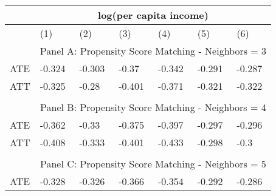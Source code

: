 \begin{table}[]
\begin{tabular}{lllllll}
\hline
                       & \multicolumn{6}{c}{log(per capita income)}                                                                                                   \\ \hline
                       & (1)                  & (2)                   & (3)                   & (4)                   & (5)                   & (6)                   \\ \hline
                       & \multicolumn{6}{c}{Panel A: Propensity Score Matching - Neighbors = 3}                                                                       \\
ATE                    & -0.324               & -0.303                & -0.37                 & -0.342                & -0.291                & -0.287                \\
ATT                    & -0.325               & -0.28                 & -0.401                & -0.371                & -0.321                & -0.322                \\
                       &                      &                       &                       &                       &                       &                       \\
                       & \multicolumn{6}{c}{Panel B: Propensity Score Matching - Neighbors = 4}                                                                       \\
ATE                    & -0.362               & -0.33                 & -0.375                & -0.397                & -0.297                & -0.296                \\
ATT                    & -0.408               & -0.333                & -0.401                & -0.433                & -0.298                & -0.3                  \\
                       &                      &                       &                       &                       &                       &                       \\
                       & \multicolumn{6}{c}{Panel C: Propensity Score Matching - Neighbors = 5}                                                                       \\
ATE                    & -0.328               & -0.326                & -0.366                & -0.354                & -0.292                & -0.286                \\

\end{tabular}
\end{table}
